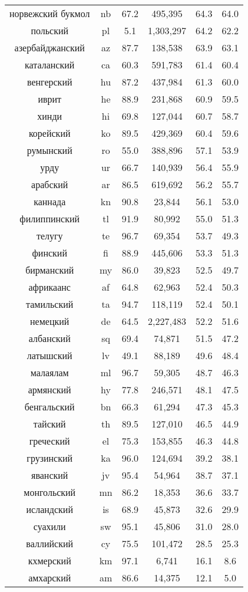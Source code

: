 \begin{table*}
{\begin{tabular}{|c|c|c||c|c|c|}
норвежский букмол & nb & 67.2 & 495,395 & 64.3 & 64.0\\
польский & pl & 5.1 & 1,303,297 & 64.2 & 62.2\\
азербайджанский & az & 87.7 & 138,538 & 63.9 & 63.1\\
каталанский & ca & 60.3 & 591,783 & 61.4 & 60.4\\
венгерский & hu & 87.2 & 437,984 & 61.3 & 60.0\\
иврит & he & 88.9 & 231,868 & 60.9 & 59.5\\
хинди & hi & 69.8 & 127,044 & 60.7 & 58.7\\
корейский & ko & 89.5 & 429,369 & 60.4 & 59.6\\
румынский & ro & 55.0 & 388,896 & 57.1 & 53.9\\
урду & ur & 66.7 & 140,939 & 56.4 & 55.9\\
арабский & ar & 86.5 & 619,692 & 56.2 & 55.7\\
каннада & kn & 90.8 & 23,844 & 56.1 & 53.0\\
филиппинский & tl & 91.9 & 80,992 & 55.0 & 51.3\\
телугу & te & 96.7 & 69,354 & 53.7 & 49.3\\
финский & fi & 88.9 & 445,606 & 53.3 & 51.3\\
бирманский & my & 86.0 & 39,823 & 52.5 & 49.7\\
африкаанс & af & 64.8 & 62,963 & 52.4 & 50.3\\
тамильский & ta & 94.7 & 118,119 & 52.4 & 50.1\\
немецкий & de & 64.5 & 2,227,483 & 52.2 & 51.6\\
албанский & sq & 69.4 & 74,871 & 51.5 & 47.2\\
латышский & lv & 49.1 & 88,189 & 49.6 & 48.4\\
малаялам & ml & 96.7 & 59,305 & 48.7 & 46.3\\
армянский & hy & 77.8 & 246,571 & 48.1 & 47.5\\
бенгальский & bn & 66.3 & 61,294 & 47.3 & 45.3\\
тайский & th & 89.5 & 127,010 & 46.5 & 44.9\\
греческий & el & 75.3 & 153,855 & 46.3 & 44.8\\
грузинский & ka & 96.0 & 124,694 & 39.2 & 38.1\\
яванский & jv & 95.4 & 54,964 & 38.7 & 37.1\\
монгольский & mn & 86.2 & 18,353 & 36.6 & 33.7\\
исландский & is & 68.9 & 45,873 & 32.6 & 29.9\\
суахили & sw & 95.1 & 45,806 & 31.0 & 28.0\\
валлийский & cy & 75.5 & 101,472 & 28.5 & 25.3\\
кхмерский & km & 97.1 & 6,741 & 16.1 & 8.6\\
амхарский & am & 86.6 & 14,375 & 12.1 & 5.0\\ \hline
\end{tabular}
}
\end{table*}
